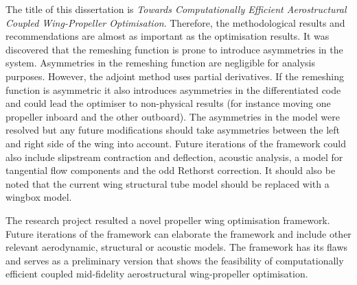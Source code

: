 The title of this dissertation is \textit{Towards Computationally Efficient Aerostructural Coupled Wing-Propeller Optimisation}. Therefore, the methodological results and recommendations are almost as important as the optimisation results. It was discovered that the remeshing function is prone to introduce asymmetries in the system. Asymmetries in the remeshing function are negligible for analysis purposes. However, the adjoint method uses partial derivatives. If the remeshing function is asymmetric it also introduces asymmetries in the differentiated code and could lead the optimiser to non-physical results (for instance moving one propeller inboard and the other outboard). The asymmetries in the model were resolved but any future modifications should take asymmetries between the left and right side of the wing into account. Future iterations of the framework could also include slipstream contraction and deflection, acoustic analysis, a model for tangential flow components and the odd Rethorst correction. It should also be noted that the current wing structural tube model should be replaced with a wingbox model.

The research project resulted a novel propeller wing optimisation framework. Future iterations of the framework can elaborate the framework and include other relevant aerodynamic, structural or acoustic models. The framework has its flaws and serves as a preliminary version that shows the feasibility of computationally efficient coupled mid-fidelity aerostructural wing-propeller optimisation.